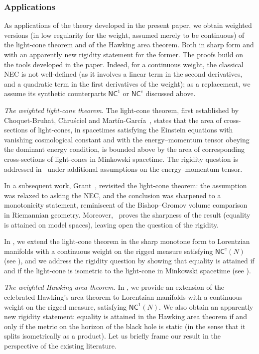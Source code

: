 \documentclass[12pt,a4paper]{amsart}
\theoremstyle{plain}
\theoremstyle{definition}
\numberwithin{equation}{section}
\newcommand{\NC}{\mathsf{NC}}
\begin{document}
\subsubsection*{\textbf{Applications}} As applications of the theory
developed in the present paper, we obtain weighted versions (in low
regularity for the weight, assumed merely to be continuous) of the
light-cone theorem and of the Hawking area theorem. Both in sharp form
and with an apparently new rigidity statement for the
  former. The proofs build on the tools developed in the paper. Indeed, for a continuous weight, the classical NEC is not well-defined (as it involves a linear term in the second derivatives, and a quadratic term in the first derivatives of the weight); as a replacement, we assume its synthetic counterparts $\NC^1$ or $\NC^e$ discussed above.
\smallskip


\textit{The weighted light-cone theorem}. The light-cone theorem, first established by Choquet-Bruhat, Chru\'sciel and Mart\'in-Garc\'ia~\cite{CBCMG-2009}, states that the area of cross-sections of light-cones, in spacetimes satisfying the Einstein equations with vanishing cosmological constant and with the energy–momentum tensor obeying the dominant energy condition, is bounded above by the area of corresponding  cross-sections of light-cones in Minkowski spacetime. The rigidity question  is addressed in~\cite{CBCMG-2009} under additional assumptions on the energy–momentum tensor. 

In a subsequent work, Grant~\cite{Grant}, revisited the light-cone theorem: the assumption was relaxed to asking the NEC, and the conclusion was sharpened to a monotonicity statement, reminiscent of the Bishop--Gromov  volume comparison in Riemannian geometry. Moreover,~\cite{Grant} proves the sharpness of the result (equality is attained on model spaces), leaving open the question of the rigidity. 

In , we extend the light-cone theorem in the sharp monotone form to Lorentzian manifolds with a continuous weight on the rigged measure satisfying $\NC^e(N)$ (see ), and we address the rigidity question by showing that equality is attained if and if the light-cone is isometric to the light-cone in Minkowski spacetime  (see ).   
\smallskip


\textit{The weighted Hawking area theorem.}
In , we provide an extension of  the celebrated Hawking's area theorem to Lorentzian manifolds with a continuous weight on the rigged measure, satisfying $\NC^1(N)$. We also obtain an apparently new rigidity statement: equality is attained in the Hawking area theorem if and only if the metric on the horizon of the black hole is static (in the sense that it splits isometrically as a product). Let us briefly frame our result in the perspective of the existing literature.
\end{document}
